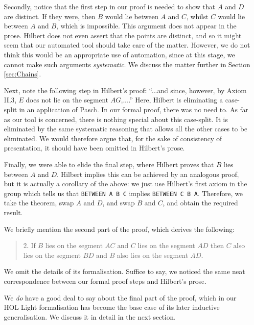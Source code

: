 Secondly, notice that the first step in our proof is needed to show that $A$ and $D$ are distinct. If they were, then $B$ would lie between $A$ and $C$, whilst $C$ would lie between $A$ and $B$, which is impossible. This argument does not appear in the prose. Hilbert does not even assert that the points are distinct, and so it might seem that our automated tool should take care of the matter. However, we do not think this would be an appropriate use of automation, since at this stage, we cannot make such arguments \emph{systematic}. We discuss the matter further in Section \ref{sec:Chains}.

Next, note the following step in Hilbert's proof: ``...and since, however, by Axiom II,3, $E$ does not lie on the segment $AG$,....'' Here, Hilbert is eliminating a case-split in an application of Pasch. In our formal proof, there was no need to. As far as our tool is concerned, there is nothing special about this case-split. It is eliminated by the same systematic reasoning that allows all the other cases to be eliminated. We would therefore argue that, for the sake of consistency of presentation, it should have been omitted in Hilbert's prose.

Finally, we were able to elide the final step, where Hilbert proves that $B$ lies between $A$ and $D$. Hilbert implies this can be achieved by an analogous proof, but it is actually a corollary of the above: we just use Hilbert's first axiom in the group which tells us that \mbox{\texttt{BETWEEN A B C}} implies \mbox{\texttt{BETWEEN C B A}}. Therefore, we take the theorem, swap $A$ and $D$, and swap $B$ and $C$, and obtain the required result.

We briefly mention the second part of the proof, which derives the following:

\begin{quote}2. If $B$ lies on the segment $AC$ and $C$ lies on the segment $AD$ then $C$ also lies on the segment $BD$ and $B$ also lies on the segment $AD$.\end{quote}

We omit the details of its formalisation. Suffice to say, we noticed the same neat correspondence between our formal proof steps and Hilbert's prose. 

We \emph{do} have a good deal to say about the final part of the proof, which in our HOL Light formalisation has become the base case of its later inductive generalisation. We discuss it in detail in the next section.


